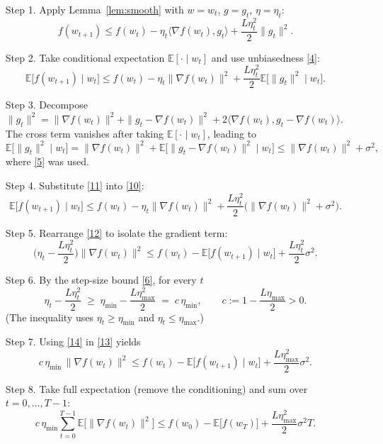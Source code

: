 \documentclass{article}
\newcommand{\E}{\mathbb{E}}
\begin{document}
\begin{enumerate}
\item[Step 1.] Apply Lemma~\ref{lem:smooth} with $w=w_t$, $g=g_t$, $\eta=\eta_t$:
\[
f(w_{t+1})\le f(w_t)-\eta_t\langle\nabla f(w_t),g_t\rangle+\frac{L\eta_t^{2}}{2}\|g_t\|^{2}.
\tag{9}
\]

\item[Step 2.] Take conditional expectation $\E[\cdot\mid w_t]$ and use unbiasedness \eqref{4}:
\[
\E\!\big[f(w_{t+1})\mid w_t\big]\le f(w_t)-\eta_t\|\nabla f(w_t)\|^{2}
+\frac{L\eta_t^{2}}{2}\E\!\big[\|g_t\|^{2}\mid w_t\big].
\tag{10}
\]

\item[Step 3.] Decompose $\|g_t\|^{2}= \|\nabla f(w_t)\|^{2}+\|g_t-\nabla f(w_t)\|^{2}+2\langle\nabla f(w_t),g_t-\nabla f(w_t)\rangle$.
The cross term vanishes after taking $\E[\cdot\mid w_t]$, leading to
\[
\E\!\big[\|g_t\|^{2}\mid w_t\big]
= \|\nabla f(w_t)\|^{2}+\E\!\big[\|g_t-\nabla f(w_t)\|^{2}\mid w_t\big]
\le \|\nabla f(w_t)\|^{2}+\sigma^{2},
\tag{11}
\]
where \eqref{5} was used.

\item[Step 4.] Substitute \eqref{11} into \eqref{10}:
\[
\E\!\big[f(w_{t+1})\mid w_t\big]
\le f(w_t)-\eta_t\|\nabla f(w_t)\|^{2}
+\frac{L\eta_t^{2}}{2}\big(\|\nabla f(w_t)\|^{2}+\sigma^{2}\big).
\tag{12}
\]

\item[Step 5.] Rearrange \eqref{12} to isolate the gradient term:
\[
\Big(\eta_t-\frac{L\eta_t^{2}}{2}\Big)\|\nabla f(w_t)\|^{2}
\le f(w_t)-\E\!\big[f(w_{t+1})\mid w_t\big]
+\frac{L\eta_t^{2}}{2}\sigma^{2}.
\tag{13}
\]

\item[Step 6.] By the step‑size bound \eqref{6}, for every $t$
\[
\eta_t-\frac{L\eta_t^{2}}{2}\;\ge\;
\eta_{\min}-\frac{L\eta_{\max}^{2}}{2}
\;=\;
c\,\eta_{\min},
\qquad
c:=1-\frac{L\eta_{\max}}{2}>0 .
\tag{14}
\]
(The inequality uses $\eta_t\ge\eta_{\min}$ and $\eta_t\le\eta_{\max}$.)

\item[Step 7.] Using \eqref{14} in \eqref{13} yields
\[
c\,\eta_{\min}\,\|\nabla f(w_t)\|^{2}
\le f(w_t)-\E\!\big[f(w_{t+1})\mid w_t\big]
+\frac{L\eta_{\max}^{2}}{2}\sigma^{2}.
\tag{15}
\]

\item[Step 8.] Take full expectation (remove the conditioning) and sum over $t=0,\dots,T-1$:
\[
c\,\eta_{\min}\sum_{t=0}^{T-1}\E\!\big[\|\nabla f(w_t)\|^{2}\big]
\le f(w_0)-\E\!\big[f(w_T)\big]
+ \frac{L\eta_{\max}^{2}}{2}\sigma^{2}T .
\tag{16}
\]


\end{enumerate}
\end{document}
